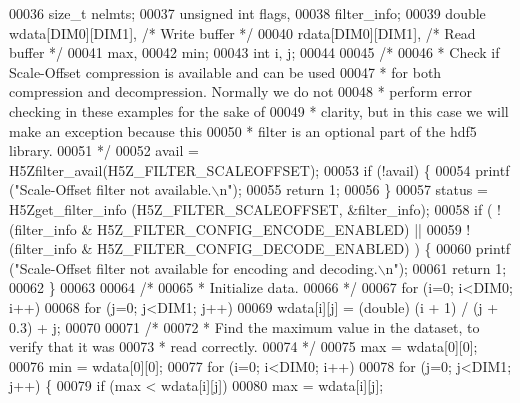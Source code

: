 \begin{DoxyCode}
00036     \textcolor{keywordtype}{size\_t}          nelmts;
00037     \textcolor{keywordtype}{unsigned} \textcolor{keywordtype}{int}    flags,
00038                     filter\_info;
00039     \textcolor{keywordtype}{double}          wdata[DIM0][DIM1],          \textcolor{comment}{/* Write buffer */}
00040                     rdata[DIM0][DIM1],          \textcolor{comment}{/* Read buffer */}
00041                     max,
00042                     min;
00043     \textcolor{keywordtype}{int}             i, j;
00044 
00045     \textcolor{comment}{/*}
00046 \textcolor{comment}{     * Check if Scale-Offset compression is available and can be used}
00047 \textcolor{comment}{     * for both compression and decompression.  Normally we do not}
00048 \textcolor{comment}{     * perform error checking in these examples for the sake of}
00049 \textcolor{comment}{     * clarity, but in this case we will make an exception because this}
00050 \textcolor{comment}{     * filter is an optional part of the hdf5 library.}
00051 \textcolor{comment}{     */}
00052     avail = H5Zfilter\_avail(H5Z\_FILTER\_SCALEOFFSET);
00053     \textcolor{keywordflow}{if} (!avail) \{
00054         printf (\textcolor{stringliteral}{"Scale-Offset filter not available.\(\backslash\)n"});
00055         \textcolor{keywordflow}{return} 1;
00056     \}
00057     status = H5Zget\_filter\_info (H5Z\_FILTER\_SCALEOFFSET, &filter\_info);
00058     \textcolor{keywordflow}{if} ( !(filter\_info & H5Z\_FILTER\_CONFIG\_ENCODE\_ENABLED) ||
00059                 !(filter\_info & H5Z\_FILTER\_CONFIG\_DECODE\_ENABLED) ) \{
00060         printf (\textcolor{stringliteral}{"Scale-Offset filter not available for encoding and decoding.\(\backslash\)n"});
00061         \textcolor{keywordflow}{return} 1;
00062     \}
00063 
00064     \textcolor{comment}{/*}
00065 \textcolor{comment}{     * Initialize data.}
00066 \textcolor{comment}{     */}
00067     \textcolor{keywordflow}{for} (i=0; i<DIM0; i++)
00068         \textcolor{keywordflow}{for} (j=0; j<DIM1; j++)
00069             wdata[i][j] = (\textcolor{keywordtype}{double}) (i + 1) / (j + 0.3) + j;
00070 
00071     \textcolor{comment}{/*}
00072 \textcolor{comment}{     * Find the maximum value in the dataset, to verify that it was}
00073 \textcolor{comment}{     * read correctly.}
00074 \textcolor{comment}{     */}
00075     max = wdata[0][0];
00076     min = wdata[0][0];
00077     \textcolor{keywordflow}{for} (i=0; i<DIM0; i++)
00078         \textcolor{keywordflow}{for} (j=0; j<DIM1; j++) \{
00079             \textcolor{keywordflow}{if} (max < wdata[i][j])
00080                 max = wdata[i][j];

\end{DoxyCode}
